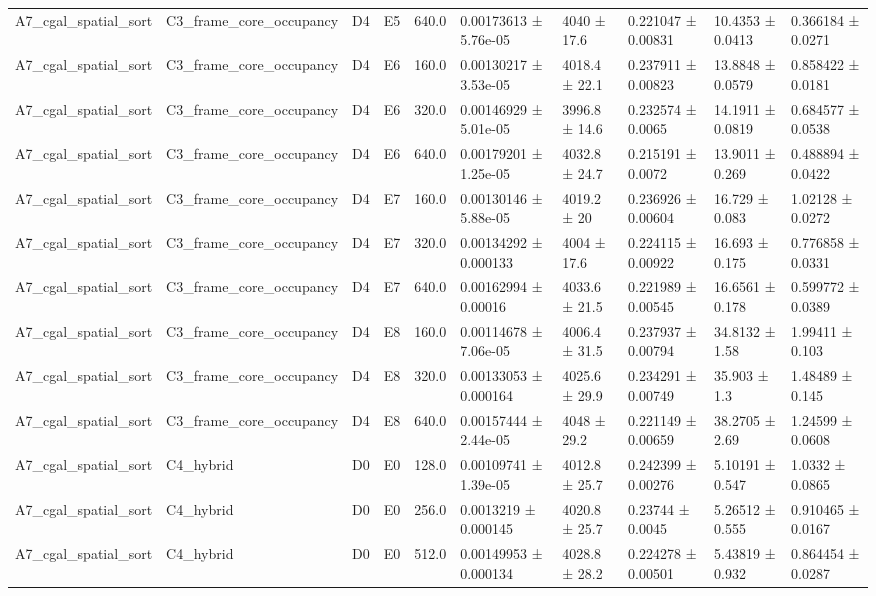 \begin{table}
\begin{tabular}{llllllllll}
A7\_cgal\_spatial\_sort & C3\_frame\_core\_occupancy & D4 & E5 & 640.0 & 0.00173613 ± 5.76e-05 & 4040 ± 17.6 & 0.221047 ± 0.00831 & 10.4353 ± 0.0413 & 0.366184 ± 0.0271 \\
A7\_cgal\_spatial\_sort & C3\_frame\_core\_occupancy & D4 & E6 & 160.0 & 0.00130217 ± 3.53e-05 & 4018.4 ± 22.1 & 0.237911 ± 0.00823 & 13.8848 ± 0.0579 & 0.858422 ± 0.0181 \\
A7\_cgal\_spatial\_sort & C3\_frame\_core\_occupancy & D4 & E6 & 320.0 & 0.00146929 ± 5.01e-05 & 3996.8 ± 14.6 & 0.232574 ± 0.0065 & 14.1911 ± 0.0819 & 0.684577 ± 0.0538 \\
A7\_cgal\_spatial\_sort & C3\_frame\_core\_occupancy & D4 & E6 & 640.0 & 0.00179201 ± 1.25e-05 & 4032.8 ± 24.7 & 0.215191 ± 0.0072 & 13.9011 ± 0.269 & 0.488894 ± 0.0422 \\
A7\_cgal\_spatial\_sort & C3\_frame\_core\_occupancy & D4 & E7 & 160.0 & 0.00130146 ± 5.88e-05 & 4019.2 ± 20 & 0.236926 ± 0.00604 & 16.729 ± 0.083 & 1.02128 ± 0.0272 \\
A7\_cgal\_spatial\_sort & C3\_frame\_core\_occupancy & D4 & E7 & 320.0 & 0.00134292 ± 0.000133 & 4004 ± 17.6 & 0.224115 ± 0.00922 & 16.693 ± 0.175 & 0.776858 ± 0.0331 \\
A7\_cgal\_spatial\_sort & C3\_frame\_core\_occupancy & D4 & E7 & 640.0 & 0.00162994 ± 0.00016 & 4033.6 ± 21.5 & 0.221989 ± 0.00545 & 16.6561 ± 0.178 & 0.599772 ± 0.0389 \\
A7\_cgal\_spatial\_sort & C3\_frame\_core\_occupancy & D4 & E8 & 160.0 & 0.00114678 ± 7.06e-05 & 4006.4 ± 31.5 & 0.237937 ± 0.00794 & 34.8132 ± 1.58 & 1.99411 ± 0.103 \\
A7\_cgal\_spatial\_sort & C3\_frame\_core\_occupancy & D4 & E8 & 320.0 & 0.00133053 ± 0.000164 & 4025.6 ± 29.9 & 0.234291 ± 0.00749 & 35.903 ± 1.3 & 1.48489 ± 0.145 \\
A7\_cgal\_spatial\_sort & C3\_frame\_core\_occupancy & D4 & E8 & 640.0 & 0.00157444 ± 2.44e-05 & 4048 ± 29.2 & 0.221149 ± 0.00659 & 38.2705 ± 2.69 & 1.24599 ± 0.0608 \\
A7\_cgal\_spatial\_sort & C4\_hybrid & D0 & E0 & 128.0 & 0.00109741 ± 1.39e-05 & 4012.8 ± 25.7 & 0.242399 ± 0.00276 & 5.10191 ± 0.547 & 1.0332 ± 0.0865 \\
A7\_cgal\_spatial\_sort & C4\_hybrid & D0 & E0 & 256.0 & 0.0013219 ± 0.000145 & 4020.8 ± 25.7 & 0.23744 ± 0.0045 & 5.26512 ± 0.555 & 0.910465 ± 0.0167 \\
A7\_cgal\_spatial\_sort & C4\_hybrid & D0 & E0 & 512.0 & 0.00149953 ± 0.000134 & 4028.8 ± 28.2 & 0.224278 ± 0.00501 & 5.43819 ± 0.932 & 0.864454 ± 0.0287 \\

\end{tabular}
\end{table}
